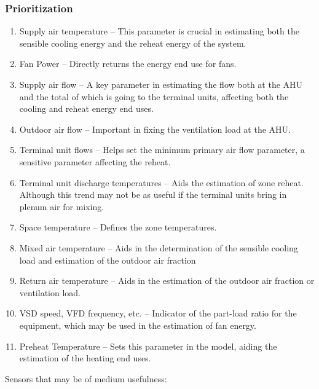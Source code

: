 \subsubsection{Prioritization} \label{sec:Prioritization}
\begin{enumerate}
\item Supply air temperature -- This parameter is crucial in estimating both the sensible cooling energy and the reheat energy of the system. 
\item Fan Power -- Directly returns the energy end use for fans.
\item Supply air flow -- A key parameter in estimating the flow both at the AHU and the total of which is going to the terminal units, affecting both the cooling and reheat energy end uses.
\item Outdoor air flow -- Important in fixing the ventilation load at the AHU.
\item Terminal unit flows -- Helps set the minimum primary air flow parameter, a sensitive parameter affecting the reheat. 
\item Terminal unit discharge temperatures -- Aids the estimation of
    zone reheat. Although this trend may not be as useful if the
    terminal units bring in plenum air for mixing. 
\item Space temperature -- Defines the zone temperatures. 
\item Mixed air temperature -- Aids in the determination of the sensible cooling load and estimation of the outdoor air fraction
\item Return air temperature -- Aids in the estimation of the outdoor air fraction or ventilation load.
\item VSD speed, VFD frequency, etc. -- Indicator of the part-load ratio for the equipment, which may be used in the estimation of fan energy. 
\item Preheat Temperature -- Sets this parameter in the model, aiding the estimation of the heating end uses.
\end{enumerate}

Sensors that may be of medium usefulness:

